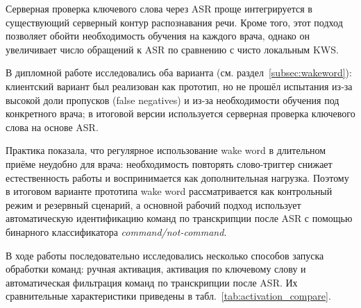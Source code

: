 Серверная проверка ключевого слова через ASR проще интегрируется в существующий серверный контур распознавания речи.
Кроме того, этот подход позволяет обойти необходимость обучения на каждого врача, однако он увеличивает число обращений к ASR по сравнению с чисто локальным KWS.

В дипломной работе исследовались оба варианта (см. раздел~\ref{subsec:wakeword}): клиентский вариант был реализован как прототип, но не прошёл испытания из‑за высокой доли пропусков (false negatives) и из‑за необходимости обучения под конкретного врача; в итоговой версии используется серверная проверка ключевого слова на основе ASR.

Практика показала, что регулярное использование wake word в длительном приёме неудобно для врача:
необходимость повторять слово-триггер снижает естественность работы и воспринимается как дополнительная нагрузка.
Поэтому в итоговом варианте прототипа wake word рассматривается как контрольный режим и резервный сценарий,
а основной рабочий подход использует автоматическую идентификацию команд по транскрипции после ASR
с помощью бинарного классификатора \textit{command/not-command}.

В ходе работы последовательно исследовались несколько способов запуска обработки команд:
ручная активация, активация по ключевому слову и автоматическая фильтрация команд
по транскрипции после ASR. Их сравнительные характеристики приведены в табл.~\ref{tab:activation_compare}.

